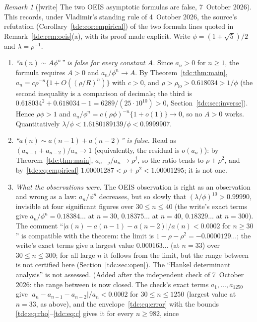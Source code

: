\documentclass[11pt]{article}
\theoremstyle{definition}\newtheorem{definition}[theorem]{Definition}
\theoremstyle{remark}\newtheorem{remark}[theorem]{Remark}
\newcommand{\rhol}{\rho_{\mathrm{lo}}}
\begin{document}
\begin{remark}[{[write]} The two OEIS asymptotic formulas are false, 7~October 2026]\label{tdc:rem:refuted}
This records, under Vladimir's standing rule of 4~October 2026, the
source's refutation (Corollary~\ref{tdc:cor:empirical}) of the two formula
lines quoted in Remark~\ref{tdc:rem:oeis}(a), with its proof made explicit.
Write $\phi=(1+\sqrt5)/2$ and $\lambda=\rho^{-1}$.
\begin{enumerate}[label=(\alph*)]
\item \emph{``$a(n)\sim A\phi^n$'' is false for every constant $A$.} Since
 $a_n>0$ for $n\ge1$, the formula requires $A>0$ and $a_n/\phi^n\to A$. By
 Theorem~\ref{tdc:thm:main}, $a_n=c\rho^{-n}\{1+O((\rho/R)^n)\}$ with
 $c>0$, and $\rho>\rhol>0.618034>1/\phi$ (the second inequality is a
 comparison of decimals; the third is
 $0.618034^2+0.618034-1=6289/(25\cdot10^{10})>0$, Section~\ref{tdc:sec:inverse}).
 Hence $\rho\phi>1$ and $a_n/\phi^n=c(\rho\phi)^{-n}\{1+o(1)\}\to0$, so no
 $A>0$ works. Quantitatively $\lambda/\phi<1.6180189139/\phi<0.9999907$.
\item \emph{``$a(n)\sim a(n-1)+a(n-2)$'' is false.} Read as
 $(a_{n-1}+a_{n-2})/a_n\to1$ (equivalently, the residual is $o(a_n)$): by
 Theorem~\ref{tdc:thm:main}, $a_{n-j}/a_n\to\rho^j$, so the ratio tends to
 $\rho+\rho^2$, and by~\eqref{tdc:eq:empirical}
 $1.00001287<\rho+\rho^2<1.00001295$; it is not one.
\item \emph{What the observations were.} The OEIS observation is right as
 an observation and wrong as a law: $a_n/\phi^n$ decreases, but so slowly
 that $(\lambda/\phi)^{10}>0.99990$, invisible at four significant figures
 over $30\le n\le40$ (the write's exact terms give $a_n/\phi^n=0.18384\ldots$
 at $n=30$, $0.18375\ldots$ at $n=40$, $0.18329\ldots$ at $n=300$). The
 comment ``$|a(n)-a(n-1)-a(n-2)|/a(n)<0.0002$ for $n\ge30$'' is compatible
 with the theorem: the limit is $1-\rho-\rho^2=-0.0000129\ldots$; the write's
 exact terms give a largest value $0.000163\ldots$ (at $n=33$) over
 $30\le n\le300$; for all large $n$ it follows from the limit, but the
 range between is not certified here (Section~\ref{tdc:sec:open}). The
 ``Hankel determinant analysis'' is not assessed.
 \textup{(Added after the independent check of 7~October 2026: the range
 between is now closed. The check's exact terms $a_1,\dots,a_{1250}$ give
 $|a_n-a_{n-1}-a_{n-2}|/a_n<0.0002$ for $30\le n\le1250$ (largest value at
 $n=33$, as above), and the envelope~\eqref{tdc:eq:error} with the bounds
 \eqref{tdc:eq:rho}--\eqref{tdc:eq:c} gives it for every $n\ge982$, since
}
\end{enumerate}
\end{remark}
\end{document}
